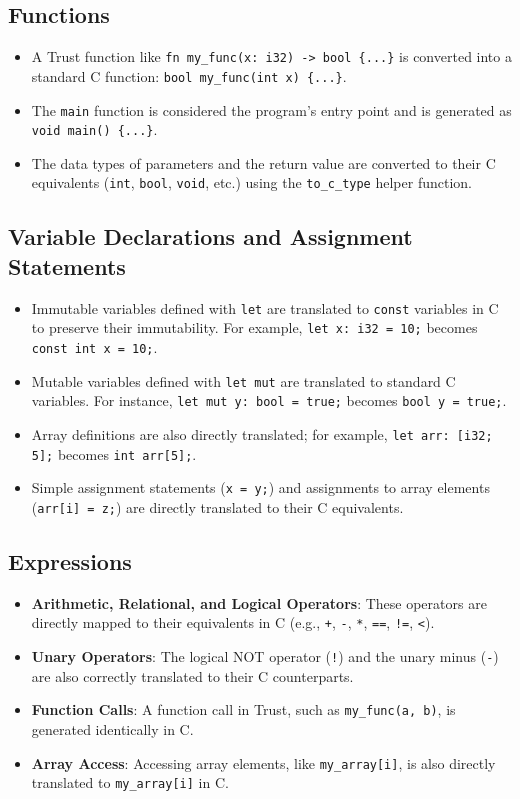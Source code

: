 \documentclass[12pt, a4paper]{report}
\begin{document}
\subsection{Functions}
\begin{itemize}
    \item A Trust function like \texttt{fn my\_func(x: i32) -> bool \{...\}} is converted into a standard C function: \texttt{bool my\_func(int x) \{...\}}.
    \item The \texttt{main} function is considered the program's entry point and is generated as \texttt{void main() \{...\}}.
    \item The data types of parameters and the return value are converted to their C equivalents (\texttt{int}, \texttt{bool}, \texttt{void}, etc.) using the \texttt{to\_c\_type} helper function.
\end{itemize}

\subsection{Variable Declarations and Assignment Statements}
\begin{itemize}
    \item Immutable variables defined with \texttt{let} are translated to \texttt{const} variables in C to preserve their immutability. For example, \texttt{let x: i32 = 10;} becomes \texttt{const int x = 10;}.
    \item Mutable variables defined with \texttt{let mut} are translated to standard C variables. For instance, \texttt{let mut y: bool = true;} becomes \texttt{bool y = true;}.
    \item Array definitions are also directly translated; for example, \texttt{let arr: [i32; 5];} becomes \texttt{int arr[5];}.
    \item Simple assignment statements (\texttt{x = y;}) and assignments to array elements (\texttt{arr[i] = z;}) are directly translated to their C equivalents.
\end{itemize}

\subsection{Expressions}
\begin{itemize}
    \item \textbf{Arithmetic, Relational, and Logical Operators}: These operators are directly mapped to their equivalents in C (e.g., \texttt{+}, \texttt{-}, \texttt{*}, \texttt{==}, \texttt{!=}, \texttt{<}).
    \item \textbf{Unary Operators}: The logical NOT operator (\texttt{!}) and the unary minus (\texttt{-}) are also correctly translated to their C counterparts.
    \item \textbf{Function Calls}: A function call in Trust, such as \texttt{my\_func(a, b)}, is generated identically in C.
    \item \textbf{Array Access}: Accessing array elements, like \texttt{my\_array[i]}, is also directly translated to \texttt{my\_array[i]} in C.
\end{itemize}
\end{document}
